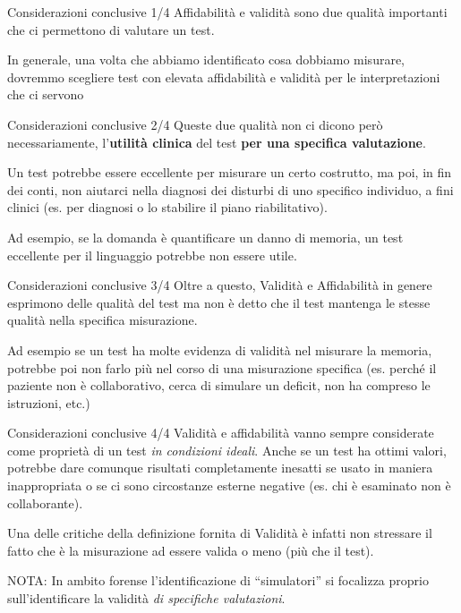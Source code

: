 \documentclass[
  ignorenonframetext,
]{beamer}
\begin{document}
\begin{frame}{Considerazioni conclusive 1/4}
\label{considerazioni-conclusive-14}
Affidabilità e validità sono due qualità importanti che ci permettono di
valutare un test.

In generale, una volta che abbiamo identificato cosa dobbiamo misurare,
dovremmo scegliere test con elevata affidabilità e validità per le
interpretazioni che ci servono
\end{frame}

\begin{frame}{Considerazioni conclusive 2/4}
\label{considerazioni-conclusive-24}
Queste due qualità non ci dicono però necessariamente, l'\textbf{utilità
clinica} del test \textbf{per una specifica valutazione}.

Un test potrebbe essere eccellente per misurare un certo costrutto, ma
poi, in fin dei conti, non aiutarci nella diagnosi dei disturbi di uno
specifico individuo, a fini clinici (es. per diagnosi o lo stabilire il
piano riabilitativo).

Ad esempio, se la domanda è quantificare un danno di memoria, un test
eccellente per il linguaggio potrebbe non essere utile.
\end{frame}

\begin{frame}{Considerazioni conclusive 3/4}
\label{considerazioni-conclusive-34}
Oltre a questo, Validità e Affidabilità in genere esprimono delle
qualità del test ma non è detto che il test mantenga le stesse qualità
nella specifica misurazione.

Ad esempio se un test ha molte evidenza di validità nel misurare la
memoria, potrebbe poi non farlo più nel corso di una misurazione
specifica (es. perché il paziente non è collaborativo, cerca di simulare
un deficit, non ha compreso le istruzioni, etc.)
\end{frame}

\begin{frame}{Considerazioni conclusive 4/4}
\label{considerazioni-conclusive-44}
Validità e affidabilità vanno sempre considerate come proprietà di un
test \emph{in condizioni ideali}. Anche se un test ha ottimi valori,
potrebbe dare comunque risultati completamente inesatti se usato in
maniera inappropriata o se ci sono circostanze esterne negative (es. chi
è esaminato non è collaborante).

Una delle critiche della definizione fornita di Validità è infatti non
stressare il fatto che è la misurazione ad essere valida o meno (più che
il test).

NOTA: In ambito forense l'identificazione di ``simulatori'' si focalizza
proprio sull'identificare la validità \emph{di specifiche valutazioni}.
\end{frame}
\end{document}
